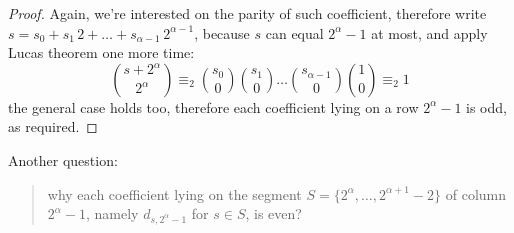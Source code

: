 \documentclass[11pt,a4paper]{article} %
\begin{document}
\begin{proof}
        Again, we're interested on the parity of such coefficient, therefore
        write $s=s_{0}+s_{1}\,2+\ldots+s_{\alpha-1}\,2^{\alpha-1}$, because $s$ can equal 
        $2^{\alpha}-1$ at most, and apply Lucas theorem one more time:
        \begin{displaymath}
            {{s+2^{\alpha}}\choose{2^{\alpha}}}\equiv_{2} 
                {{s_{0}}\choose{0}}{{s_{1}}\choose{0}} \ldots
                    {{s_{\alpha-1}}\choose{0}}{{1}\choose{0}}\equiv_{2}1 
        \end{displaymath}
        the general case holds too, therefore each coefficient lying on
        a row $2^{\alpha}-1$ is odd, as required.
    \end{proof}

    Another question: 
    \begin{quote}
        why each coefficient lying on the segment 
        $S=\lbrace2^{\alpha},\ldots,2^{\alpha+1}-2\rbrace$ of column 
        $2^{\alpha}-1$, namely $d_{s,2^{\alpha}-1}$ for $s\in S$, is even?
    \end{quote}
\end{document}

